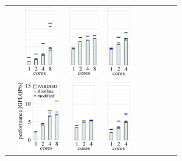 \begin{tabular}{lcccccccc}
  & 
  \includegraphics[height=3.0cm,clip=true]{images/perf/p-80/p-knightmare1-omen-rgf-tc2_5-lc160}%
  & 
  \includegraphics[height=3.0cm,clip=true]{images/perf/p-80/p-summitridge1-omen-rgf-tc2_5-lc160}%
  & 
  \includegraphics[height=3.0cm,clip=true]{images/perf/p-80/p-naples1-omen-rgf-tc2_5-lc160}%
\\
\raisebox{1.70cm}{\rotatebox[origin=c]{90}{omen2}} &
  \includegraphics[height=3.0cm,clip=true]{images/perf/p-80/p-emmy-omen-rgf-tc3_5}%
  & 
  \includegraphics[height=3.0cm,clip=true]{images/perf/p-80/p-woody-hsw-omen-rgf-tc3_5}%
  & 
  \includegraphics[height=3.0cm,clip=true]{images/perf/p-80/p-hasep1-omen-rgf-tc3_5}%

\end{tabular}
